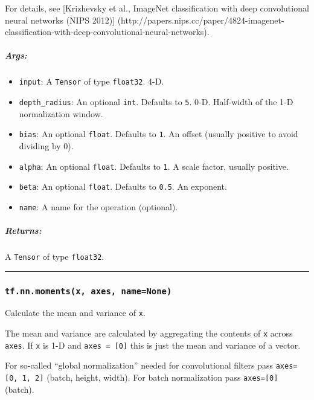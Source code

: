 For details, see {[}Krizhevsky et al., ImageNet classification with deep
convolutional neural networks (NIPS 2012){]}
(http://papers.nips.cc/paper/4824-imagenet-classification-with-deep-convolutional-neural-networks).

\subparagraph{Args: }\label{args-14}

\begin{itemize}
\tightlist
\item
  \texttt{input}: A \texttt{Tensor} of type \texttt{float32}. 4-D.
\item
  \texttt{depth\_radius}: An optional \texttt{int}. Defaults to
  \texttt{5}. 0-D. Half-width of the 1-D normalization window.
\item
  \texttt{bias}: An optional \texttt{float}. Defaults to \texttt{1}. An
  offset (usually positive to avoid dividing by 0).
\item
  \texttt{alpha}: An optional \texttt{float}. Defaults to \texttt{1}. A
  scale factor, usually positive.
\item
  \texttt{beta}: An optional \texttt{float}. Defaults to \texttt{0.5}.
  An exponent.
\item
  \texttt{name}: A name for the operation (optional).
\end{itemize}

\subparagraph{Returns: }\label{returns-14}

A \texttt{Tensor} of type \texttt{float32}.

\begin{center}\rule{0.5\linewidth}{\linethickness}\end{center}

\subsubsection{\texorpdfstring{\texttt{tf.nn.moments(x,\ axes,\ name=None)}
}{tf.nn.moments(x, axes, name=None) }}\label{tf.nn.momentsx-axes-namenone}

Calculate the mean and variance of \texttt{x}.

The mean and variance are calculated by aggregating the contents of
\texttt{x} across \texttt{axes}. If \texttt{x} is 1-D and
\texttt{axes\ =\ {[}0{]}} this is just the mean and variance of a
vector.

For so-called ``global normalization'' needed for convolutional filters
pass \texttt{axes={[}0,\ 1,\ 2{]}} (batch, height, width). For batch
normalization pass \texttt{axes={[}0{]}} (batch).

